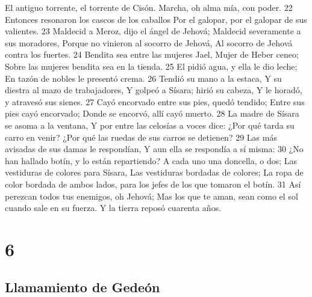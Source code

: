El antiguo torrente, el torrente de Cisón.
Marcha, oh alma mía, con poder.
22 Entonces resonaron los cascos de los caballos
Por el galopar, por el galopar de sus valientes.
23 Maldecid a Meroz, dijo el ángel de Jehová;
Maldecid severamente a sus moradores,
Porque no vinieron al socorro de Jehová,
Al socorro de Jehová contra los fuertes.
24 Bendita sea entre las mujeres Jael,
Mujer de Heber ceneo;
Sobre las mujeres bendita sea en la tienda.
25 El pidió agua, y ella le dio leche; 
En tazón de nobles le presentó crema.
26 Tendió su mano a la estaca,
Y su diestra al mazo de trabajadores,
Y golpeó a Sísara; hirió su cabeza,
Y le horadó, y atravesó sus sienes. 
27 Cayó encorvado entre sus pies, quedó tendido;
Entre sus pies cayó encorvado;
Donde se encorvó, allí cayó muerto.
28 La madre de Sísara se asoma a la ventana,
Y por entre las celosías a voces dice:
¿Por qué tarda su carro en venir?
¿Por qué las ruedas de sus carros se detienen?
29 Las más avisadas de sus damas le respondían,
Y aun ella se respondía a sí misma:
30 ¿No han hallado botín, y lo están repartiendo?
A cada uno una doncella, o dos;
Las vestiduras de colores para Sísara,
Las vestiduras bordadas de colores;
La ropa de color bordada de ambos lados, para los jefes de los que tomaron el botín.
31 Así perezcan todos tus enemigos, oh Jehová;
Mas los que te aman, sean como el sol cuando sale en su fuerza.
Y la tierra reposó cuarenta años.

\chapter{6}

\section*{Llamamiento de Gedeón}


